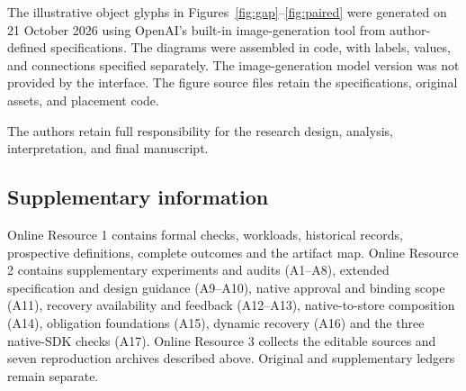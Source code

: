 \documentclass[pdflatex,sn-basic]{sn-jnl}
\begin{document}
The illustrative object glyphs in Figures~\ref{fig:gap}--\ref{fig:paired} were generated on 21 October 2026 using OpenAI's built-in image-generation tool from author-defined specifications. The diagrams were assembled in code, with labels, values, and connections specified separately. The image-generation model version was not provided by the interface. The figure source files retain the specifications, original assets, and placement code.

The authors retain full responsibility for the research design, analysis, interpretation, and final manuscript.

\subsection*{Supplementary information}
Online Resource 1 contains formal checks, workloads, historical records, prospective definitions, complete outcomes and the artifact map. Online Resource 2 contains supplementary experiments and audits (A1--A8), extended specification and design guidance (A9--A10), native approval and binding scope (A11), recovery availability and feedback (A12--A13), native-to-store composition (A14), obligation foundations (A15), dynamic recovery (A16) and the three native-SDK checks (A17). Online Resource 3 collects the editable sources and seven reproduction archives described above. Original and supplementary ledgers remain separate.


\end{document}
